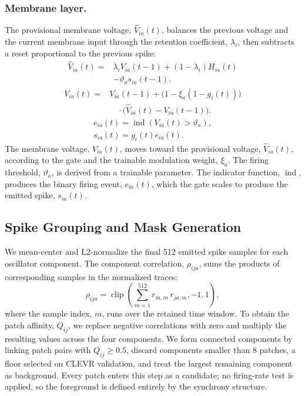 \subsubsection{Membrane layer.}
The provisional membrane voltage, $\widehat V_{ia}(t)$, balances the previous voltage and the
current membrane input through the retention coefficient, $\lambda_i$, then subtracts a reset
proportional to the previous spike:
\begin{equation}\label{eq:membrane-provisional}
\begin{aligned}
\widehat V_{ia}(t)={}&\lambda_iV_{ia}(t-1)+(1-\lambda_i)H_{ia}(t)\\
&-\vartheta_a s_{ia}(t-1).
\end{aligned}
\end{equation}
\begin{equation}
\begin{aligned}
V_{ia}(t)={}&V_{ia}(t-1)+\bigl(1-\xi_a(1-g_i(t))\bigr)\\
&\quad{}\cdot\bigl(\widehat V_{ia}(t)-V_{ia}(t-1)\bigr).
\end{aligned}
\end{equation}
\begin{equation}
\begin{gathered}
e_{ia}(t)=\operatorname{ind}(V_{ia}(t)>\vartheta_a),\\
s_{ia}(t)=g_i(t)e_{ia}(t).
\end{gathered}
\end{equation}
The membrane voltage, $V_{ia}(t)$, moves toward the provisional voltage, $\widehat V_{ia}(t)$,
according to the gate and the trainable modulation weight, $\xi_a$. The firing threshold,
$\vartheta_a$, is derived from a trainable parameter. The indicator function, $\operatorname{ind}$,
produces the binary firing event, $e_{ia}(t)$, which the gate scales to produce the emitted spike,
$s_{ia}(t)$.

\subsection{Spike Grouping and Mask Generation}

We mean-center and L2-normalize the final 512 emitted spike samples for each oscillator component.
The component correlation, $\rho_{ija}$, sums the products of corresponding samples in the
normalized traces:
\begin{equation}\label{eq:spike-correlation}
\rho_{ija}=\operatorname{clip}\left(
  \sum_{m=1}^{512} r_{ia,m}\,r_{ja,m},-1,1\right),
\end{equation}
where the sample index, $m$, runs over the retained time window. To obtain the patch affinity,
$Q_{ij}$, we replace negative correlations with zero and multiply the resulting values across the
four components. We form connected components by linking patch pairs with $Q_{ij}\geq0.5$, discard
components smaller than 8 patches, a floor selected on CLEVR validation, and treat the largest
remaining component as background. Every patch enters this step as a candidate; no firing-rate
test is applied, so the foreground is defined entirely by the synchrony structure.

